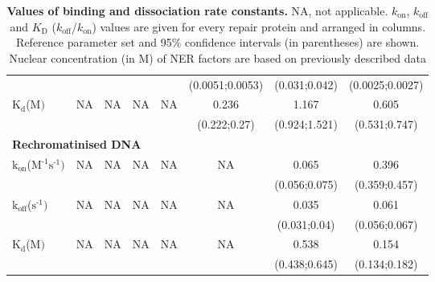 \begin{table}[H]
\begin{tabular}{lccccccc}
		&                               &                              &                           &                          &(0.0051;0.0053)     &  (0.031;0.042)  & (0.0025;0.0027)  \\
		$\text{K}_{\text{d}}$({\textmu}$\text{M})$                                                  & NA                          &NA                         & NA                      &NA                      &0.236                   &1.167                    &0.605     \\
		&                               &                              &                           &                          &(0.222;0.27)     &  (0.924;1.521)  & (0.531;0.747)  \\
		\multicolumn{8}{l}{\textbf{Rechromatinised DNA}} \\
		$\text{k}_{\text{on}}$({\textmu}$\text{M}^{\text{-1}}\text{s}^{\text{-1}})$    & NA                          & NA                        & NA                      &  NA                    & NA                       &0.065                    &0.396    \\
		&                               &                             &                            &                          &                            &(0.056;0.075)    & (0.359;0.457)    \\
		$\text{k}_{\text{off}}$($\text{s}^{\text{-1}})$                                             & NA                          &NA                          & NA                      & NA                     & NA                       & 0.035                   &0.061     \\
		&                               &                              &                           &                          &                            &  (0.031;0.04)  & (0.056;0.067)  \\
		$\text{K}_{\text{d}}$({\textmu}$\text{M})$                                                  & NA                          &NA                         & NA                      &NA                      &NA                         &0.538                    &0.154     \\
		&                               &                              &                           &                          &                            &  (0.438;0.645)  & (0.134;0.182)  \\
		\hline
	\end{tabular}
	\caption{\textbf{Values of binding and dissociation rate constants.} NA, not applicable. $k_{\text{on}}$, $k_{\text{off}}$ and $K_{\text{D}}$ ($k_{\text{off}}$/$k_{\text{on}}$) values are given for every repair protein and arranged in columns. Reference parameter set and 95\% confidence intervals (in parentheses) are shown. Nuclear concentration (in \textmu M) of NER factors are based on previously described data \cite{Luijsterburg2010}}
	\label{tab:parameter_bigTable}
\end{table}

